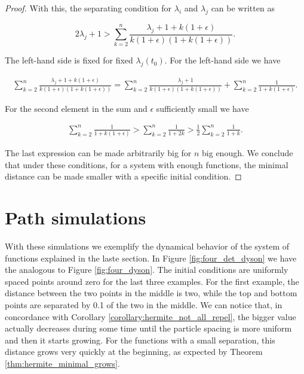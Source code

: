 \begin{proof}
    With this, the separating condition for $\lambda_i$ and $\lambda_j$ can be written as

    \begin{equation*}
        2\lambda_j + 1 > \sum_{k=2}^{n} \frac{\lambda_j + 1 + k(1+\epsilon)}{k(1+\epsilon)(1+k(1+\epsilon))}. 
    \end{equation*}

    The left-hand side is fixed for fixed $\lambda_j(t_0)$. For the left-hand side we have

    \begin{align*}
        \sum_{k=2}^{n} \frac{\lambda_j + 1 + k(1+\epsilon)}{k(1+\epsilon)(1+k(1+\epsilon))} = \sum_{k=2}^n \frac{\lambda_j + 1}{k(1+\epsilon)(1+k(1+\epsilon))} + \sum_{k=2}^n \frac{1}{1+k(1+\epsilon)}.
    \end{align*}

    For the second element in the sum and $\epsilon$ sufficiently small we have 

    \begin{align*}
        \sum_{k=2}^n \frac{1}{1+k(1+\epsilon)} > \sum_{k=2}^n \frac{1}{1+2k} > \frac12\sum_{k=2}^n \frac{1}{1+k}.
    \end{align*}

    The last expression can be made arbitrarily big for $n$ big enough. We conclude that under these conditions, for a system with enough functions, the minimal distance can be made smaller with a specific initial condition.
    
\end{proof}

\newpage 
\section{Path simulations}

With these simulations we exemplify the dynamical behavior of the system of functions explained in the laste section. In Figure \ref{fig:four_det_dyson} we have the analogous to Figure \ref{fig:four_dyson}. The initial conditions are uniformly spaced points around zero for the last three examples. For the first example, the distance between the two points in the middle is two, while the top and bottom points are separated by 0.1 of the two in the middle. We can notice that, in concordance with Corollary \ref{corollary:hermite_not_all_repel}, the bigger value actually decreases during some time until the particle spacing is more uniform and then it starts growing. For the functions with a small separation, this distance grows very quickly at the beginning, as expected by Theorem \ref{thm:hermite_minimal_grows}.


